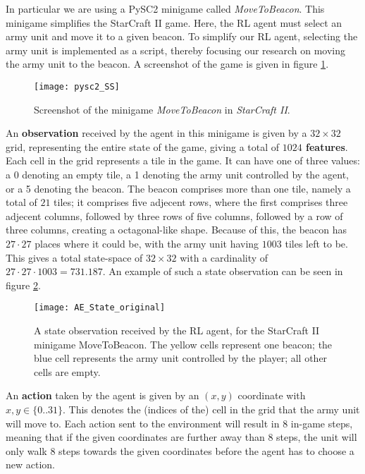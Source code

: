 In particular we are using a PySC2 minigame called \emph{MoveToBeacon}. This minigame simplifies the StarCraft II game. Here, the RL agent must select an army unit and move it to a given beacon. To simplify our RL agent, selecting the army unit is implemented as a script, thereby focusing our research on moving the army unit to the beacon. A screenshot of the game is given in figure \ref{fig:pysc2_SS}. 

\begin{figure}[h]
    \centering
    \texttt{[image: pysc2\_SS]}
    \caption{Screenshot of the minigame \emph{MoveToBeacon} in \emph{StarCraft II}.}
    \label{fig:pysc2_SS}
\end{figure}

An \textbf{observation} received by the agent in this minigame is given by a $32 \times 32$ grid, representing the entire state of the game,  giving a total of \textbf{$1024$ features}. Each cell in the grid represents a tile in the game. It can have one of three values: a 0 denoting an empty tile, a 1 denoting the army unit controlled by the agent, or a 5 denoting the beacon. The beacon comprises more than one tile, namely a total of $21$ tiles; it comprises five adjecent rows, where the first comprises three adjecent columns, followed by three rows of five columns, followed by a row of three columns, creating a octagonal-like shape. Because of this, the beacon has $27 \cdot 27$ places where it could be, with the army unit having $1003$ tiles left to be. This gives  a total state-space of $32 \times 32$ with a cardinality of $27 \cdot 27 \cdot 1003 = 731.187$. An example of such a state observation can be seen in figure \ref{fig:state_example}.

\begin{figure}[h]
    \centering
    \texttt{[image: AE\_State\_original]}
    \caption{A state observation received by the RL agent, for the StarCraft II minigame MoveToBeacon. The yellow cells represent one beacon; the blue cell represents the army unit controlled by the player; all other cells are empty.}
    \label{fig:state_example}
\end{figure}

An \textbf{action} taken by the agent is given by an $(x,y)$ coordinate with $x,y \in \{0 .. 31\}$. This denotes the (indices of the) cell in the grid that the army unit will move to. Each action sent to the environment will result in $8$ in-game steps, meaning that if the given coordinates are further away than 8 steps, the unit will only walk 8 steps towards the given coordinates before the agent has to choose a new action.


